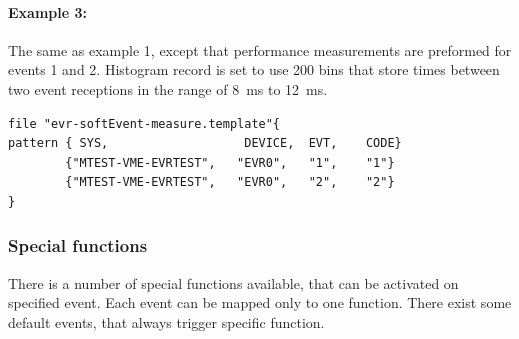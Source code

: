 \documentclass[12pt,a4paper]{article}
\begin{document}
\paragraph{Example 3:} The same as example 1, except that performance measurements are preformed for events 1 and 2. Histogram record is set to use 200 bins that store times between two event receptions in the range of 8~ms to 12~ms.
\begin{verbatim}
file "evr-softEvent-measure.template"{
pattern { SYS,                   DEVICE,  EVT,    CODE}
        {"MTEST-VME-EVRTEST",   "EVR0",   "1",    "1"}
        {"MTEST-VME-EVRTEST",   "EVR0",   "2",    "2"}
}
\end{verbatim}

\subsubsection{Special functions}\label{sec:Special functions}
There is a number of special functions available, that can be activated
on specified event. Each event can be mapped only to one function. There
exist some default events, that always trigger specific function.
\end{document}

